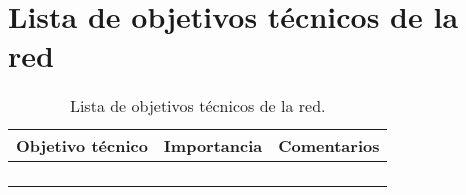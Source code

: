 \section{Lista de objetivos técnicos de la red}

\begin{table}[H]
	\begin{center}
		\begin{tabular}{|l|l|l|}
			\hline 
			Objetivo técnico & Importancia & Comentarios \\ 
			\hline \hline
			& & \\ \hline
			& & \\ \hline
			& & \\ \hline
			& & \\ \hline		
		\end{tabular}
		\caption{Lista de objetivos técnicos de la red.}
		\label{tabla:tabla4}
	\end{center}
\end{table}

%
%

       
